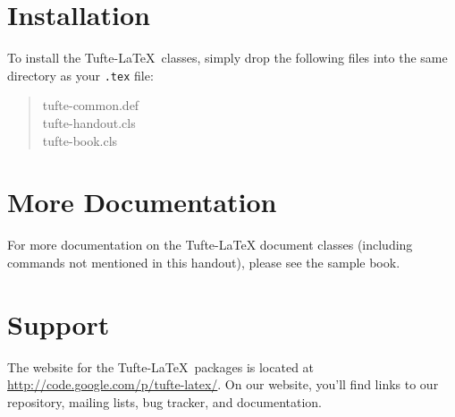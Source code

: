 \documentclass{tufte-handout}
\begin{document}
\section{Installation}\label{sec:installation}
To install the Tufte-\LaTeX\ classes, simply drop the
following files into the same directory as your \texttt{.tex}
file:
\begin{quote}
  \ttfamily
  tufte-common.def\\
  tufte-handout.cls\\
  tufte-book.cls
\end{quote}




\section{More Documentation}\label{sec:more-doc}
For more documentation on the Tufte-\LaTeX{} document classes (including commands not
mentioned in this handout), please see the sample book.

\section{Support}\label{sec:support}

The website for the Tufte-\LaTeX\ packages is located at
\url{http://code.google.com/p/tufte-latex/}.  On our website, you'll find
links to our  repository, mailing lists, bug tracker, and documentation.



\end{document}
